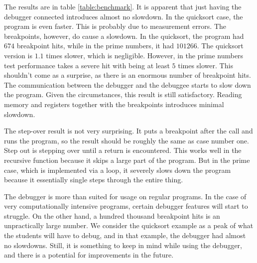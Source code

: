 The results are in table \ref{table:benchmark}. It is apparent that just having
the debugger connected introduces almost no slowdown. In the quicksort case,
the program is even faster. This is probably due to measurement errors. The
breakpoints, however, do cause a slowdown. In the quicksort, the program had
$674$ breakpoint hits, while in the prime numbers, it had $101266$. The
quicksort version is $1.1$ times slower, which is negligible. However, in the
prime numbers test performance takes a severe hit with being at least $5$ times
slower. This shouldn't come as a surprise, as there is an enormous number of
breakpoint hits. The communication between the debugger and the debuggee starts
to slow down the program. Given the circumstances, this result is still
satisfactory. Reading memory and registers together with the breakpoints
introduces minimal slowdown.

The step-over result is not very surprising. It puts a breakpoint after the
call and runs the program, so the result should be roughly the same as case
number one. Step out is stepping over until a return is encountered. This works
well in the recursive function because it skips a large part of the program.
But in the prime case, which is implemented via a loop, it severely slows down
the program because it essentially single steps through the entire thing.

The debugger is more than suited for usage on regular programs. In the case of
very computationally intensive programs, certain debugger features will start
to struggle. On the other hand, a hundred thousand breakpoint hits is an
unpractically large number. We consider the quicksort example as a peak of what
the students will have to debug, and in that example, the debugger had almost
no slowdowns. Still, it is something to keep in mind while using the debugger,
and there is a potential for improvements in the future.
